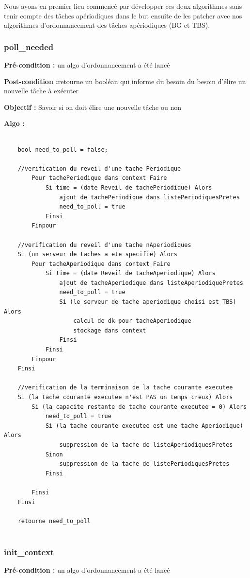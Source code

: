 			Nous avons en premier lieu commencé par développer ces deux algorithmes sans tenir compte des tâches apériodiques dans le but ensuite de les \og patcher \fg avec nos algorithmes d'ordonnancement des tâches apériodiques (BG et TBS).
			
			
			\subsubsection{poll\_needed}
				\label{sec:algo_poll}

				\textbf{Pré-condition :} un algo d'ordonnancement a été lancé
				
				\textbf{Post-condition :}retourne un booléan qui informe du besoin du besoin d'élire un nouvelle tâche à exécuter
				
				\textbf{Objectif :} Savoir si on doit élire une nouvelle tâche ou non
				
				\textbf{Algo :} 
					\begin{lstlisting}
					
	bool need_to_poll = false;
	
	//verification du reveil d'une tache Periodique
		Pour tachePeriodique dans context Faire
			Si time = (date Reveil de tachePeriodique) Alors
				ajout de tachePeriodique dans listePeriodiquesPretes
				need_to_poll = true
			Finsi
		Finpour
		
	//verification du reveil d'une tache nAperiodiques
	Si (un serveur de taches a ete specifie) Alors
		Pour tacheAperiodique dans context Faire
			Si time = (date Reveil de tacheAperiodique) Alors
				ajout de tacheAperiodique dans listeAperiodiquePretes
				need_to_poll = true
				Si (le serveur de tache aperiodique choisi est TBS) Alors
					calcul de dk pour tacheAperiodique
					stockage dans context
				Finsi
			Finsi
		Finpour
	Finsi
			
	//verification de la terminaison de la tache courante executee
	Si (la tache courante executee n'est PAS un temps creux) Alors
		Si (la capacite restante de tache courante executee = 0) Alors
			need_to_poll = true
			Si (la tache courante executee est une tache Aperiodique) Alors
				suppression de la tache de listeAperiodiquesPretes
			Sinon
				suppression de la tache de listePeriodiquesPretes
			Finsi
	
		Finsi
	Finsi
		
	retourne need_to_poll
				
					\end{lstlisting}
				
			\subsubsection{init\_context}
				\textbf{Pré-condition :} un algo d'ordonnancement a été lancé
				
